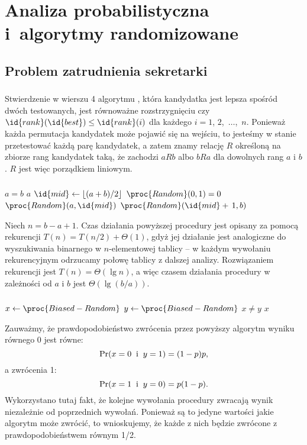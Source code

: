 \chapter{Analiza probabilistyczna i~algorytmy randomizowane}

\section{Problem zatrudnienia sekretarki}

\subsection{} %
Stwierdzenie w wierszu 4 algorytmu , która kandydatka jest lepsza spośród dwóch testowanych, jest równoważne rozstrzygnięciu czy $\id{rank}(\id{best})\le\id{rank}(i)$ dla każdego $i=1$, $2$,~$\dots$,~$n$. Ponieważ każda permutacja kandydatek może pojawić się na wejściu, to jesteśmy w stanie przetestować każdą parę kandydatek, a zatem znamy relację $R$ określoną na zbiorze rang kandydatek taką, że zachodzi $aRb$ albo $bRa$ dla dowolnych rang $a$ i $b$. $R$ jest więc porządkiem liniowym.

\subsection{} %
\begin{codebox}
\li	\If $a=b$
\li		\Then
			\Return $a$
		\End
\li	$\id{mid}\gets\lfloor(a+b)/2\rfloor$
\li	\If $\proc{Random}(0,1)=0$
\li		\Then
			\Return $\proc{Random}(a,\id{mid})$
\li		\Else
			\Return $\proc{Random}(\id{mid}+\,1,b)$
		\End
\end{codebox}
Niech $n=b-a+1$. Czas działania powyższej procedury jest opisany za pomocą rekurencji $T(n)=T(n/2)+\Theta(1)$, gdyż jej działanie jest analogiczne do wyszukiwania binarnego w $n$-elementowej tablicy -- w każdym wywołaniu rekurencyjnym odrzucamy połowę tablicy z dalszej analizy. Rozwiązaniem rekurencji jest $T(n)=\Theta(\lg n)$, a więc czasem działania procedury  w zależności od $a$ i $b$ jest $\Theta(\lg(b/a))$.

\subsection{} %
\begin{codebox}
\li	\Repeat
		$x\gets\proc{Biased-Random}$
\li		$y\gets\proc{Biased-Random}$
\li	\Until $x\ne y$ \label{li:unbiased-repeat-end}
\li \Return $x$
\end{codebox}
Zauważmy, że prawdopodobieństwo zwrócenia przez powyższy algorytm wyniku równego 0 jest równe:
\[
	\Pr(x=0\;\;\hbox{i}\;\;y=1) = (1-p)p,
\]
a zwrócenia 1:
\[
	\Pr(x=1\;\;\hbox{i}\;\;y=0) = p(1-p).
\]
Wykorzystano tutaj fakt, że kolejne wywołania procedury  zwracają wynik niezależnie od poprzednich wywołań. Ponieważ są to jedyne wartości jakie algorytm może zwrócić, to wnioskujemy, że każde z nich będzie zwrócone z prawdopodobieństwem równym 1/2.

